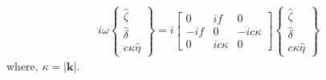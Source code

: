 \documentclass[a4paper,12pt]{paper}
\begin{document}
\begin{align}
 i\omega
   \begin{Bmatrix}
       \hat{\zeta} \\ \hat{\delta} \\c\kappa\hat{\eta}
  \end{Bmatrix}
  = i
  \begin{bmatrix}
     0 & if & 0 \\
   -if &  0 & -ic\kappa \\
     0 & ic\kappa & 0 
  \end{bmatrix}
  \begin{Bmatrix}
       \hat{\zeta} \\ \hat{\delta} \\c\kappa\hat{\eta}
  \end{Bmatrix}
\end{align}
where, $\kappa = |\mathbf{k}|$.
\end{document}
